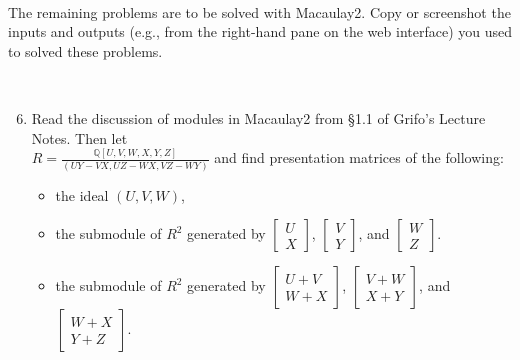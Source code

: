 \documentclass[12pt]{amsart}
\newcommand{\Q}{\mathbb{Q}}
\begin{document}
\


The remaining problems are to be solved with Macaulay2. Copy or screenshot the inputs and outputs (e.g., from the right-hand pane on the web interface) you used to solved these problems.

\

\begin{enumerate}\setcounter{enumi}{5}


\item  Read the discussion of modules in Macaulay2 from \S1.1 of Grifo's Lecture Notes. Then let \\ $\displaystyle{R=\frac{\Q[U,V, W , X , Y , Z]}{(UY-VX,UZ-WX,VZ-WY)}}$ and find presentation matrices of the following:
\begin{itemize}
\item the ideal $(U,V,W)$,
\item the submodule of $R^2$ generated by $\begin{bmatrix} U \\ X \end{bmatrix}$, $\begin{bmatrix} V \\ Y \end{bmatrix}$, and $\begin{bmatrix} W \\ Z \end{bmatrix}$.
\item the submodule of $R^2$ generated by $\begin{bmatrix} U +V \\ W+X \end{bmatrix}$, $\begin{bmatrix} V+W \\ X+Y \end{bmatrix}$, and $\begin{bmatrix} W+X \\ Y+Z \end{bmatrix}$.
\end{itemize}
\end{enumerate}
\end{document}
